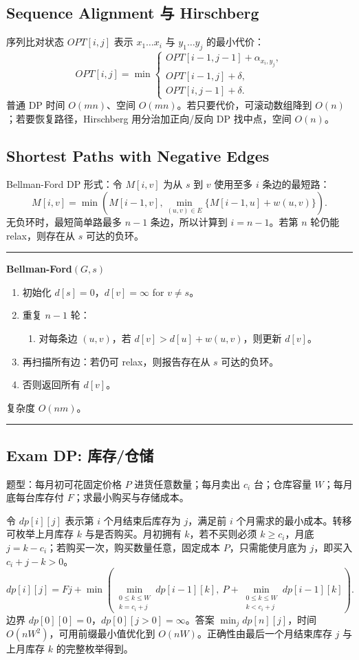 \documentclass[UTF8,a4paper,11pt]{ctexart}
\newenvironment{algobox}[1]
{\par\medskip\noindent\begin{minipage}{0.96\linewidth}\hrule\vspace{0.35em}\textbf{#1}\par\vspace{0.25em}\small}
{\par\vspace{0.25em}\hrule\end{minipage}\par\medskip}
\begin{document}
\subsection{Sequence Alignment 与 Hirschberg}

序列比对状态 $OPT[i,j]$ 表示 $x_1\ldots x_i$ 与 $y_1\ldots y_j$ 的最小代价：
\[
OPT[i,j]=\min\begin{cases}
OPT[i-1,j-1]+\alpha_{x_i,y_j},\\
OPT[i-1,j]+\delta,\\
OPT[i,j-1]+\delta.
\end{cases}
\]
普通 DP 时间 $O(mn)$、空间 $O(mn)$。若只要代价，可滚动数组降到 $O(n)$；若要恢复路径，Hirschberg 用分治加正向/反向 DP 找中点，空间 $O(n)$。

\subsection{Shortest Paths with Negative Edges}

Bellman-Ford DP 形式：令 $M[i,v]$ 为从 $s$ 到 $v$ 使用至多 $i$ 条边的最短路：
\[
M[i,v]=\min\left(M[i-1,v],\min_{(u,v)\in E}\{M[i-1,u]+w(u,v)\}\right).
\]
无负环时，最短简单路最多 $n-1$ 条边，所以计算到 $i=n-1$。若第 $n$ 轮仍能 relax，则存在从 $s$ 可达的负环。

\begin{algobox}{Bellman-Ford$(G,s)$}
\begin{enumerate}
  \item 初始化 $d[s]=0$，$d[v]=\infty$ for $v\ne s$。
  \item 重复 $n-1$ 轮：
  \begin{enumerate}
    \item 对每条边 $(u,v)$，若 $d[v]>d[u]+w(u,v)$，则更新 $d[v]$。
  \end{enumerate}
  \item 再扫描所有边：若仍可 relax，则报告存在从 $s$ 可达的负环。
  \item 否则返回所有 $d[v]$。
\end{enumerate}
复杂度 $O(nm)$。
\end{algobox}

\subsection{Exam DP: 库存/仓储}

题型：每月初可花固定价格 $P$ 进货任意数量；每月卖出 $c_i$ 台；仓库容量 $W$；每月底每台库存付 $F$；求最小购买与存储成本。

令 $dp[i][j]$ 表示第 $i$ 个月结束后库存为 $j$，满足前 $i$ 个月需求的最小成本。转移可枚举上月库存 $k$ 与是否购买。月初拥有 $k$，若不买则必须 $k\ge c_i$，月底 $j=k-c_i$；若购买一次，购买数量任意，固定成本 $P$，只需能使月底为 $j$，即买入 $c_i+j-k>0$。
\[
dp[i][j]=Fj+\min\left(
\min_{\substack{0\le k\le W\\k=c_i+j}} dp[i-1][k],\
P+\min_{\substack{0\le k\le W\\k<c_i+j}} dp[i-1][k]
\right).
\]
边界 $dp[0][0]=0$，$dp[0][j>0]=\infty$。答案 $\min_j dp[n][j]$，时间 $O(nW^2)$，可用前缀最小值优化到 $O(nW)$。正确性由最后一个月结束库存 $j$ 与上月库存 $k$ 的完整枚举得到。
\end{document}
